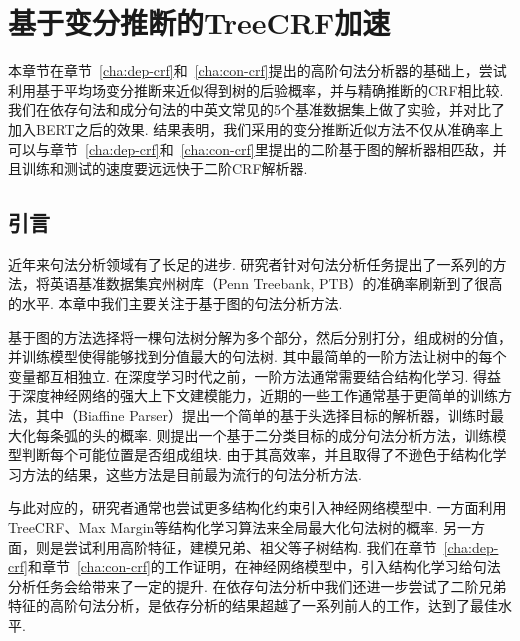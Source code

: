 \chapter{基于变分推断的TreeCRF加速}
\label{cha:vi}

本章节在章节~\ref{cha:dep-crf}和~\ref{cha:con-crf}提出的高阶句法分析器的基础上，尝试利用基于平均场变分推断来近似得到树的后验概率，并与精确推断的CRF相比较.
我们在依存句法和成分句法的中英文常见的5个基准数据集上做了实验，并对比了加入BERT之后的效果.
结果表明，我们采用的变分推断近似方法不仅从准确率上可以与章节~\ref{cha:dep-crf}和~\ref{cha:con-crf}里提出的二阶基于图的解析器相匹敌，并且训练和测试的速度要远远快于二阶CRF解析器.

\section{引言}\label{sec:vi-intro}
近年来句法分析领域有了长足的进步.
研究者针对句法分析任务提出了一系列的方法\citep{dozat-etal-2017-biaffine,gomez-rodriguez-vilares-2018-constituent,ji-etal-2019-graph,zhang-etal-2020-fast,wei-etal-2020-span}，将英语基准数据集宾州树库（Penn Treebank, PTB）的准确率刷新到了很高的水平.
本章中我们主要关注于基于图的句法分析方法.

基于图的方法选择将一棵句法树分解为多个部分，然后分别打分，组成树的分值，并训练模型使得能够找到分值最大的句法树.
其中最简单的一阶方法让树中的每个变量都互相独立.
在深度学习时代之前，一阶方法通常需要结合结构化学习\citep{mcdonald-etal-2005-online,koo-etal-2007-structured,taskar-etal-2004-max}.
得益于深度神经网络的强大上下文建模能力，近期的一些工作通常基于更简单的训练方法，其中\citet{dozat-etal-2017-biaffine}（Biaffine Parser）提出一个简单的基于头选择目标的解析器，训练时最大化每条弧的头的概率.
\citet{gaddy-etal-2018-whats}则提出一个基于二分类目标的成分句法分析方法，训练模型判断每个可能位置是否组成组块.
由于其高效率，并且取得了不逊色于结构化学习方法的结果\citep{zhang-etal-2019-empirical,falenska-kuhn-2019-non}，这些方法是目前最为流行的句法分析方法.

与此对应的，研究者通常也尝试更多结构化约束引入神经网络模型中.
一方面利用TreeCRF、Max Margin\citep{ma-hovy-2017-neural,falenska-kuhn-2019-non,stern-etal-2017-minimal}等结构化学习算法来全局最大化句法树的概率.
另一方面，则是尝试利用高阶特征，建模兄弟、祖父等子树结构\citep{mcdonald-pereira-2006-online,koo-collins-2010-efficient}.
我们在章节~\ref{cha:dep-crf}和章节~\ref{cha:con-crf}的工作证明，在神经网络模型中，引入结构化学习给句法分析任务会给带来了一定的提升.
在依存句法分析中我们还进一步尝试了二阶兄弟特征的高阶句法分析，是依存分析的结果超越了一系列前人的工作，达到了最佳水平.


